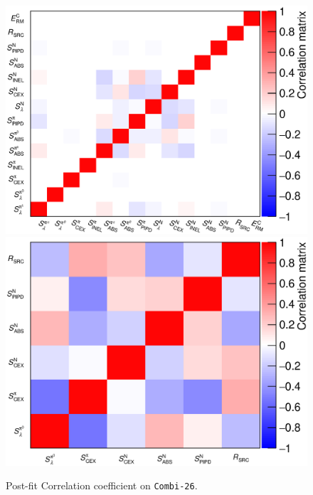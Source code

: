 \begin{figure}[!htb] 	
    \centering 		

    \includegraphics[width=\dbfigwid\textwidth]{figures/tuning/result_test_comb_26_cor_allpar_covfix.eps}
    \includegraphics[width=\dbfigwid\textwidth]{figures/tuning/result_test_comb_26_cor_redpar_covfix.eps}
    \caption{ Post-fit Correlation coefficient on \texttt{Combi-26}. } 
\end{figure}


